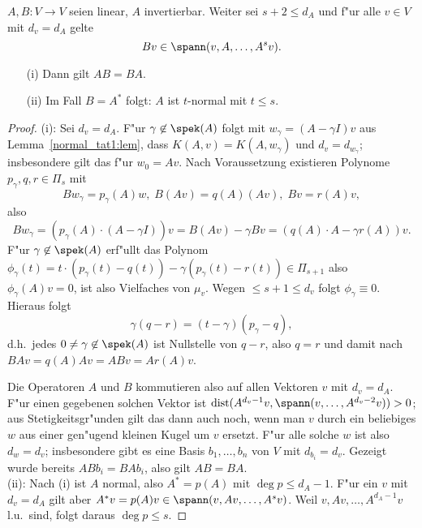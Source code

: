 \begin{lem} \label{FMproof1:lem}
$A,B: V \to V$ seien linear, $A$ invertierbar. Weiter sei $s+2 \leq d_A$ und 
f"ur alle $v \in V$ mit $d_v = d_A$  gelte
\[
Bv \in \spann(v,A,\ldots,A^s v).
\]
\begin{itemize}
\item[(i)] Dann gilt $AB = BA$.
\item[(ii)] Im Fall $B = A^*$ folgt: $A$ ist $t$-normal mit $t \leq s$.
\end{itemize} 
\end{lem}
\begin{proof}
(i): Sei $d_v = d_A$. F"ur $\gamma \not \in \spek(A)$ folgt mit $w_\gamma = (A-\gamma I)v$
aus Lemma~\ref{normal_tat1:lem}, dass $K(A,v) = K(A,w_\gamma)$ und $d_v = d_{w_\gamma}$; insbesondere gilt das f"ur $w_0 = Av$. Nach Voraussetzung existieren Polynome $p_\gamma,
q,r \in \Pi_s$ mit
\begin{equation} \label{BAs:eq}
   Bw_\gamma = p_\gamma(A)w, \; B(Av) = q(A)(Av), \; Bv = r(A)v,
\end{equation}
also
\[
Bw_\gamma = (p_\gamma(A)\cdot(A -\gamma I))v = B(Av)-\gamma Bv = (q(A)\cdot A - \gamma r(A))v. 
\]
F"ur $\gamma \not \in \spek(A)$ erf"ullt das Polynom $\phi_\gamma(t) = t\cdot(p_\gamma(t)-q(t))-\gamma(p_\gamma(t)-r(t)) \in \Pi_{s+1}$ 
also $\phi_\gamma(A)v = 0$, ist also Vielfaches von $\mu_v$. Wegen $\leq s+1 \leq d_v$
folgt $\phi_\gamma \equiv 0$. Hieraus folgt 
\[
   \gamma(q-r) = (t-\gamma)(p_\gamma - q),
\]
d.h.\ jedes $0 \neq \gamma \not \in \spek(A)$ ist Nullstelle von $q-r$,
also $q=r$ und damit nach  $BAv = q(A)Av = ABv = Ar(A)v$. 

Die Operatoren
$A$ und $B$  kommutieren also auf allen Vektoren $v$ mit $d_v = d_A$. F"ur einen gegebenen solchen Vektor
ist $\mbox{dist}(A^{d_v-1}v,\spann(v,\ldots,A^{d_v-2}v)) >0$; aus Stetigkeitsgr"unden 
gilt das dann auch noch, wenn man $v$ durch ein beliebiges $w$ aus einer gen"ugend kleinen 
Kugel um $v$ ersetzt. F"ur alle solche $w$ ist also $d_w = d_v$; insbesondere gibt
es eine Basis $b_1,\ldots,b_n$ von $V$ mit $d_{b_i} = d_v$. Gezeigt wurde bereits
$ABb_i = BAb_i$, also gilt $AB = BA$. \smallskip \\
(ii): Nach (i) ist $A$ normal, also $A^* = p(A)$ mit $\deg p \leq d_A-1$. F"ur ein $v$ mit 
$d_v = d_A$ gilt aber $A^*v = p(A)v \in \spann(v,Av,\ldots,A^sv)$. Weil $v,Av,\ldots,A^{d_A-1}v$
l.u.\ sind, folgt daraus $\deg p \leq s$.
\end{proof}
\medskip
